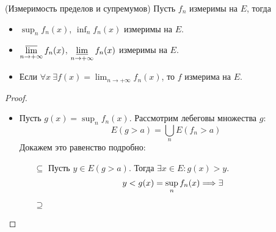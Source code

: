 \begin{theorem}(Измеримость пределов и супремумов)
	Пусть $f_n$ измеримы на $E$, тогда
	\begin{itemize}
		\item $\displaystyle \sup_{n}{f_n(x)}$, $\displaystyle \inf_{n}{f_n(x)}$
			измеримы на $E$.
		\item $\displaystyle \varlimsup_{n \to +\infty}{f_n(x)}$, 
			$\displaystyle \varliminf_{n \to +\infty}{f_n(x)}$ измеримы на $E$.
		\item Если $\displaystyle \forall x~ \exists f(x) =
			\lim_{n \to +\infty}{f_n(x)}$, то $f$ измерима на $E$.
	\end{itemize}
\end{theorem}
\begin{proof}
	\enewline
	\begin{itemize}
		\item Пусть $\displaystyle g(x) = \sup_{n}{f_n(x)}$. Рассмотрим лебеговы 
			множества $g$:
\[
	E(g > a) = \bigcup_{n}{E(f_n > a)}
\]
	Докажем это равенство подробно:
		\begin{itemize}
			\item[$\subseteq$]
				Пусть $y \in E(g > a)$. Тогда $\exists x \in E\colon g(x) > y$.
\[
	y < g(x) = \sup_{n}{f_n(x)} \Longrightarrow \exists 
\]
			\item[$\supseteq$]
		\end{itemize}
	\end{itemize}
\end{proof}
